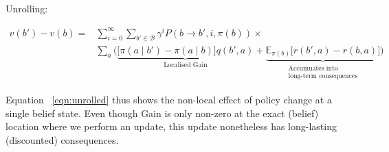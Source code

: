 \documentclass{article}
\begin{document}
Unrolling:

\begin{align}
\label{eqn:unrolled}
v(b')-v(b)=&\sum_{i=0}^{\infty}\sum_{b'\in \mathcal{B}}\gamma^{i}P(b\rightarrow b', i, \pi(b)) \times\\
&\sum_a \Big(\underbrace{\big[ \pi(a\mid b')-\pi(a\mid b) \big]q(b', a)}_{\text{Localised Gain}} +\underbrace{\mathbb{E}_{\pi(b)}\big[r(b', a)-r(b,a)\big]}_{\substack{\text{Accumuates into} \\ \text{long-term consequences}}}\Big)\nonumber
\end{align}

Equation ~\ref{eqn:unrolled} thus shows the non-local effect of policy change at a single 
belief state. Even though Gain is only non-zero at the exact (belief) location where we perform 
an update, this update nonetheless has long-lasting (discounted) consequences.
\end{document}
